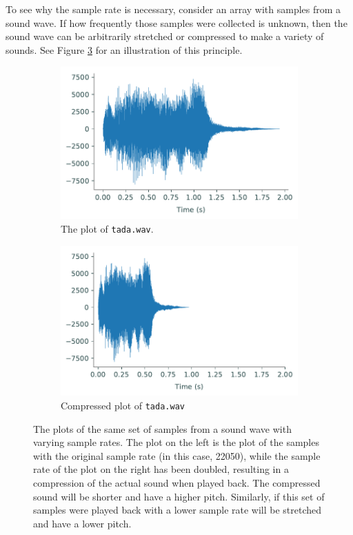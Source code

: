 To see why the sample rate is necessary, consider an array with samples from a sound wave.
If how frequently those samples were collected is unknown, then the sound wave can be arbitrarily stretched or compressed to make a variety of sounds.
See Figure \ref{fig:comp_wave} for an illustration of this principle.
\begin{figure}
\captionsetup[subfigure]{justification=centering}
\centering
\begin{subfigure}{.4\textwidth}
    \centering
    \includegraphics[width=\linewidth]{figures/tada.pdf}
    \caption{The plot of \texttt{tada.wav}.}
    \label{fig:tada}
\end{subfigure}
\begin{subfigure}{.4\textwidth}
    \centering
    \includegraphics[width=\linewidth]{figures/fast_tada.pdf}
    \caption{Compressed plot of \texttt{tada.wav}}
    \label{fig:fasttada}
\end{subfigure}
\label{fig:comp_wave}
\caption{The plots of the same set of samples from a sound wave with varying sample rates.
The plot on the left is the plot of the samples with the original sample rate (in this case, 22050), while the sample rate of the plot on the right has been doubled, resulting in a compression of the actual sound when played back.
The compressed sound will be shorter and have a higher pitch.
Similarly, if this set of samples were played back with a lower sample rate will be stretched and have a lower pitch.}
\end{figure}


